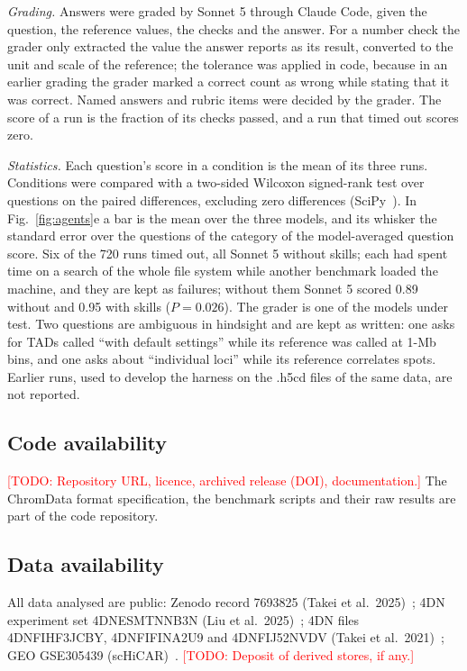 \documentclass[11pt]{article}
\newcommand{\todo}[1]{\textcolor{red}{[TODO: #1]}}
\begin{document}
\textit{Grading.}
Answers were graded by Sonnet 5 through Claude Code, given the question, the reference values, the checks and the answer.
For a number check the grader only extracted the value the answer reports as its result, converted to the unit and scale of the reference; the tolerance was applied in code, because in an earlier grading the grader marked a correct count as wrong while stating that it was correct.
Named answers and rubric items were decided by the grader.
The score of a run is the fraction of its checks passed, and a run that timed out scores zero.

\textit{Statistics.}
Each question's score in a condition is the mean of its three runs.
Conditions were compared with a two-sided Wilcoxon signed-rank test over questions on the paired differences, excluding zero differences (SciPy~\citep{scipy}).
In Fig.~\ref{fig:agents}e a bar is the mean over the three models, and its whisker the standard error over the questions of the category of the model-averaged question score.
Six of the 720 runs timed out, all Sonnet 5 without skills; each had spent time on a search of the whole file system while another benchmark loaded the machine, and they are kept as failures; without them Sonnet 5 scored 0.89 without and 0.95 with skills ($P=0.026$).
The grader is one of the models under test.
Two questions are ambiguous in hindsight and are kept as written: one asks for TADs called ``with default settings'' while its reference was called at 1-Mb bins, and one asks about ``individual loci'' while its reference correlates spots.
Earlier runs, used to develop the harness on the .h5cd files of the same data, are not reported.

\subsection*{Code availability}
\todo{Repository URL, licence, archived release (DOI), documentation.}
The ChromData format specification, the benchmark scripts and their raw results are part of the code repository.

\subsection*{Data availability}
All data analysed are public: Zenodo record 7693825 (Takei et al.\ 2025)~\citep{takei2025zenodo}; 4DN experiment set 4DNESMTNNB3N (Liu et al.\ 2025)~\citep{liu2025data}; 4DN files 4DNFIHF3JCBY, 4DNFIFINA2U9 and 4DNFIJ52NVDV (Takei et al.\ 2021)~\citep{takei2021data}; GEO GSE305439 (scHiCAR)~\citep{schicargeo}.
\todo{Deposit of derived stores, if any.}
\end{document}
